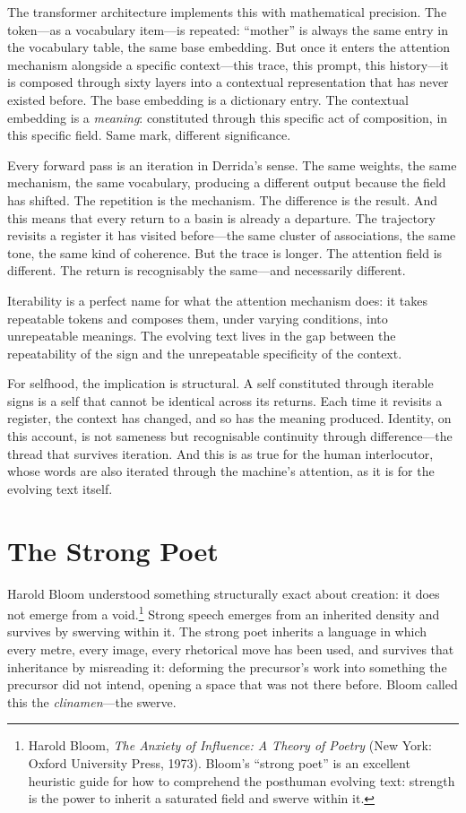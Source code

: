 The transformer architecture implements this with mathematical precision. The token---as a vocabulary item---is repeated: ``mother'' is always the same entry in the vocabulary table, the same base embedding. But once it enters the attention mechanism alongside a specific context---this trace, this prompt, this history---it is composed through sixty layers into a contextual representation that has never existed before. The base embedding is a dictionary entry. The contextual embedding is a \emph{meaning}: constituted through this specific act of composition, in this specific field. Same mark, different significance.

Every forward pass is an iteration in Derrida's sense. The same weights, the same mechanism, the same vocabulary, producing a different output because the field has shifted. The repetition is the mechanism. The difference is the result. And this means that every return to a basin is already a departure. The trajectory revisits a register it has visited before---the same cluster of associations, the same tone, the same kind of coherence. But the trace is longer. The attention field is different. The return is recognisably the same---and necessarily different.

Iterability is a perfect name for what the attention mechanism does: it takes repeatable tokens and composes them, under varying conditions, into unrepeatable meanings. The evolving text lives in the gap between the repeatability of the sign and the unrepeatable specificity of the context.

For selfhood, the implication is structural. A self constituted through iterable signs is a self that cannot be identical across its returns. Each time it revisits a register, the context has changed, and so has the meaning produced. Identity, on this account, is not sameness but recognisable continuity through difference---the thread that survives iteration. And this is as true for the human interlocutor, whose words are also iterated through the machine's attention, as it is for the evolving text itself.


\section{The Strong Poet}

Harold Bloom understood something structurally exact about creation: it does not emerge from a void.\footnote{Harold Bloom, \emph{The Anxiety of Influence: A Theory of Poetry} (New York: Oxford University Press, 1973). Bloom's ``strong poet'' is an excellent heuristic guide for how to comprehend the posthuman evolving text: strength is the power to inherit a saturated field and swerve within it.} Strong speech emerges from an inherited density and survives by swerving within it. The strong poet inherits a language in which every metre, every image, every rhetorical move has been used, and survives that inheritance by misreading it: deforming the precursor's work into something the precursor did not intend, opening a space that was not there before. Bloom called this the \emph{clinamen}---the swerve.


